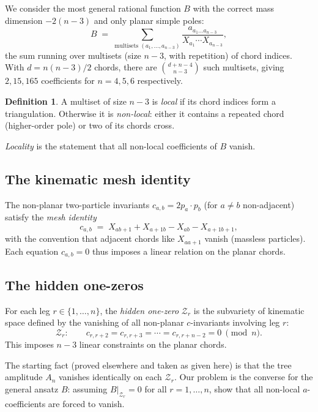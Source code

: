 \documentclass[11pt]{article}
\newcommand{\X}[2]{X_{#1#2}}
\newcommand{\Z}{\mathcal{Z}}
\theoremstyle{definition}
\newtheorem{definition}{Definition}
\begin{document}
We consider the most general rational function $B$ with the correct mass
dimension $-2(n-3)$ and only planar simple poles:
\[
B \;=\; \sum_{\text{multisets }(a_1,\ldots,a_{n-3})}
\frac{a_{a_1\ldots a_{n-3}}}{X_{a_1}\cdots X_{a_{n-3}}},
\]
the sum running over multisets (size $n-3$, with repetition) of chord
indices. With $d=n(n-3)/2$ chords, there are $\binom{d+n-4}{n-3}$ such
multisets, giving $2, 15, 165$ coefficients for $n=4, 5, 6$ respectively.

\begin{definition}
A multiset of size $n-3$ is \emph{local} if its chord indices form a
triangulation. Otherwise it is \emph{non-local}: either it contains a
repeated chord (higher-order pole) or two of its chords cross.
\end{definition}

\emph{Locality} is the statement that all non-local coefficients of $B$
vanish.

\subsection{The kinematic mesh identity}

The non-planar two-particle invariants $c_{a,b}=2p_a\cdot p_b$ (for $a\ne b$
non-adjacent) satisfy the \emph{mesh identity}
\begin{equation}
\label{eq:mesh}
c_{a,b} \;=\; \X{a}{b+1} + \X{a+1}{b} - \X{a}{b} - \X{a+1}{b+1},
\end{equation}
with the convention that adjacent chords like $\X{a}{a+1}$ vanish
(massless particles). Each equation $c_{a,b}=0$ thus imposes a linear
relation on the planar chords.

\subsection{The hidden one-zeros}

For each leg $r\in\{1,\ldots,n\}$, the \emph{hidden one-zero} $\Z_r$ is the
subvariety of kinematic space defined by the vanishing of all non-planar
$c$-invariants involving leg $r$:
\[
\Z_r:\qquad c_{r,r+2}=c_{r,r+3}=\cdots=c_{r,r+n-2}=0\ \pmod n.
\]
This imposes $n-3$ linear constraints on the planar chords.

The starting fact (proved elsewhere and taken as given here) is that the
tree amplitude $A_n$ vanishes identically on each $\Z_r$. Our problem is the
converse for the general ansatz $B$: assuming $B|_{\Z_r}=0$ for all
$r=1,\ldots,n$, show that all non-local $a$-coefficients are forced to vanish.
\end{document}
